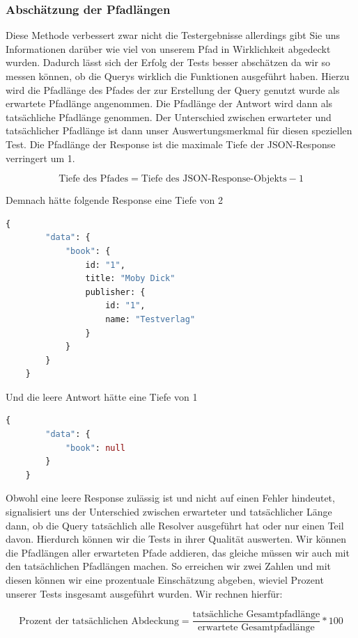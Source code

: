 \subsubsection{Abschätzung der Pfadlängen}
Diese Methode verbessert zwar nicht die Testergebnisse allerdings gibt Sie uns Informationen darüber wie viel von unserem Pfad in Wirklichkeit
abgedeckt wurden.
Dadurch lässt sich der Erfolg der Tests besser abschätzen da wir so messen können, ob die Querys wirklich die Funktionen ausgeführt haben.
Hierzu wird die Pfadlänge des Pfades der zur Erstellung der Query genutzt wurde als erwartete Pfadlänge angenommen.
Die Pfadlänge der Antwort wird dann als tatsächliche Pfadlänge genommen.
Der Unterschied zwischen erwarteter und tatsächlicher Pfadlänge ist dann unser Auswertungsmerkmal für diesen speziellen Test.
Die Pfadlänge der Response ist die maximale Tiefe der JSON-Response verringert um 1.

\[ \text{Tiefe des Pfades} = \text{Tiefe des JSON-Response-Objekts} - 1 \]

Demnach hätte folgende Response eine Tiefe von 2
\begin{lstlisting}[language=GraphQL, caption={vollständige Response}]
    {
        "data": {
            "book": {
                id: "1",
                title: "Moby Dick"
                publisher: {
                    id: "1",
                    name: "Testverlag"
                }
            }
        }
    }
\end{lstlisting}

Und die leere Antwort hätte eine Tiefe von 1

\begin{lstlisting}[language=GraphQL, caption={mangelhafte Response}]
    {
        "data": {
            "book": null
        }
    }
\end{lstlisting}

Obwohl eine leere Response zulässig ist und nicht auf einen Fehler hindeutet, signalisiert uns der Unterschied zwischen erwarteter und tatsächlicher Länge dann,
ob die Query tatsächlich alle Resolver ausgeführt hat oder nur einen Teil davon.
Hierdurch können wir die Tests in ihrer Qualität auswerten.
Wir können die Pfadlängen aller erwarteten Pfade addieren, das gleiche müssen wir auch mit den tatsächlichen Pfadlängen machen.
So erreichen wir zwei Zahlen und mit diesen können wir eine prozentuale Einschätzung abgeben, wieviel Prozent unserer Tests
insgesamt ausgeführt wurden.
Wir rechnen hierfür:

\[ \text{Prozent der tatsächlichen Abdeckung} = \frac{\text{tatsächliche Gesamtpfadlänge}}{\text{erwartete Gesamtpfadlänge}} * 100 \]

